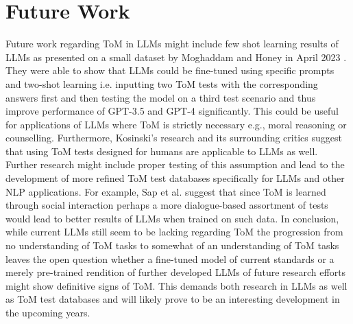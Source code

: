 \section{Future Work}
Future work regarding ToM in LLMs might include few shot learning results of LLMs as presented on a small dataset by Moghaddam and Honey in April 2023 \cite{future}. They were able to show that LLMs could be fine-tuned using specific prompts and two-shot learning i.e. inputting two ToM tests with the corresponding answers first and then testing the model on a third test scenario and thus improve performance of GPT-3.5 and GPT-4 significantly. This could be useful for applications of LLMs where ToM is strictly necessary e.g., moral reasoning or counselling. Furthermore, Kosinski's research and its surrounding critics suggest that using ToM tests designed for humans are applicable to LLMs as well. Further research might include proper testing of this assumption and lead to the development of more refined ToM test databases specifically for LLMs and other NLP applications. For example, Sap et al. \cite{related} suggest that since ToM is learned through social interaction perhaps a more dialogue-based assortment of tests would lead to better results of LLMs when trained on such data. In conclusion, while current LLMs still seem to be lacking regarding ToM the progression from no understanding of ToM tasks to somewhat of an understanding of ToM tasks leaves the open question whether a fine-tuned model of current standards or a merely pre-trained rendition of further developed LLMs of future research efforts might show definitive signs of ToM. This demands both research in LLMs as well as ToM test databases and will likely prove to be an interesting development in the upcoming years.